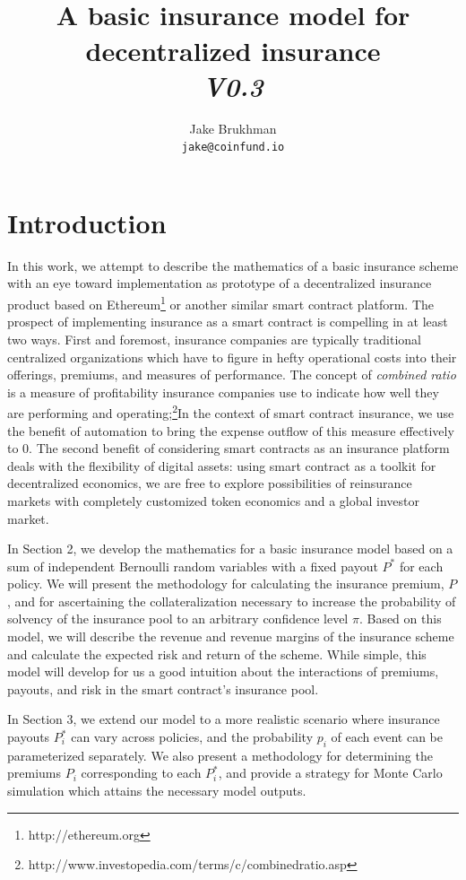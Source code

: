 \documentclass[12pt]{article}
\title{\textsc{}\\A basic insurance model for decentralized insurance\\\textit{V0.3}}
\author{Jake Brukhman\\ \texttt{jake@coinfund.io}}
\date
\begin{document}
\maketitle

\section{Introduction}

In this work, we attempt to describe the mathematics of a basic insurance scheme with an eye toward implementation as prototype of a decentralized insurance product based on Ethereum\footnote{http://ethereum.org} or another similar smart contract platform. The prospect of implementing insurance as a smart contract is compelling in at least two ways. First and foremost, insurance companies are typically traditional centralized organizations which have to figure in hefty operational costs into their offerings, premiums, and measures of performance. The concept of \textit{combined ratio} is a measure of profitability insurance companies use to indicate how well they are performing and operating;\footnote{http://www.investopedia.com/terms/c/combinedratio.asp}In the context of smart contract insurance, we use the benefit of automation to bring the expense outflow of this measure effectively to 0. The second benefit of considering smart contracts as an insurance platform deals with the flexibility of digital assets: using smart contract as a toolkit for decentralized economics, we are free to explore possibilities of reinsurance markets with completely customized token economics and a global investor market.

In Section 2, we develop the mathematics for a basic insurance model based on a sum of independent Bernoulli random variables with a fixed payout $P^*$ for each policy. We will present the methodology for calculating the insurance premium, $P$, and for ascertaining the collateralization necessary to increase the probability of solvency of the insurance pool to an arbitrary confidence level $\pi$. Based on this model, we will describe the revenue and revenue margins of the insurance scheme and calculate the expected risk and return of the scheme. While simple, this model will develop for us a good intuition about the interactions of premiums, payouts, and risk in the smart contract's insurance pool.

In Section 3, we extend our model to a more realistic scenario where insurance payouts $P_i^*$ can vary across policies, and the probability $p_i$ of each event can be parameterized separately. We also present a methodology for determining the premiums $P_i$ corresponding to each $P_i^*$, and provide a strategy for Monte Carlo simulation which attains the necessary model outputs.
\end{document}
